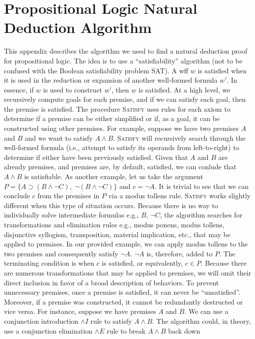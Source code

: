 \documentclass[ms]{uncgdissertationexp2}
\theoremstyle{plain}
\theoremstyle{definition}
\theoremstyle{remark}
\begin{document}


\nocite{*}

\appendix

\chapter{Propositional Logic Natural Deduction Algorithm}

This appendix describes the algorithm we used to find a natural deduction proof for propositional logic. The idea is to use a ``satisfiability'' algorithm (not to be confused with the Boolean satisfiability problem SAT). A wff $w$ is satisfied when it is used in the reduction or expansion of another well-formed formula $w'$. In essence, if $w$ is used to construct $w'$, then $w$ is satisfied. At a high level, we recursively compute goals for each premise, and if we can satisfy each goal, then the premise is satisfied. The procedure \textsc{Satisfy} uses rules for each axiom to determine if a premise can be either simplified or if, as a goal, it can be constructed using other premises. For example, suppose we have two premises $A$ and $B$ and we want to satisfy $A \land B$. \textsc{Satisfy} will recursively search through the well-formed formula (i.e., attempt to satisfy its operands from left-to-right) to determine if either have been previously satisfied. Given that $A$ and $B$ are already premises, and premises are, by default, satisfied, we can conlude that $A \land B$ is satisfiable. As another example, let us take the argument $P = \{A \supset (B \land \lnot C),\;\lnot (B \land \lnot C)\}$ and $c = \lnot A$. It is trivial to see that we can conclude $c$ from the premises in $P$ via a modus tollens rule. \textsc{Satisfy} works slightly different when this type of situation occurs. Because there is no way to individually solve intermediate formulas e.g., $B$, $\lnot C$, the algorithm searches for transformations and elimination rules e.g., modus ponens, modus tollens, disjunctive syllogism, transposition, material implication, etc., that may be applied to premises. In our provided example, we can apply modus tollens to the two premises and consequently satisfy $\lnot{A}$. $\lnot{A}$ is, therefore, added to $P$. The terminating condition is when $c$ is satisfied, or equivalently, $c \in P$. Because there are numerous transformations that may be applied to premises, we will omit their direct inclusion in favor of a broad description of behaviors. To prevent unnecessary premises, once a premise is satisfied, it can never be ``unsatisfied''. Moreover, if a premise was constructed, it cannot be redundantly destructed or vice versa. For instance, suppose we have premises $A$ and $B$. We can use a conjunction introduction $\land{I}$ rule to satisfy $A \land B$. The algorithm could, in theory, use a conjunction elimination $\land{E}$ rule to break $A \land B$ back down 
\end{document}
